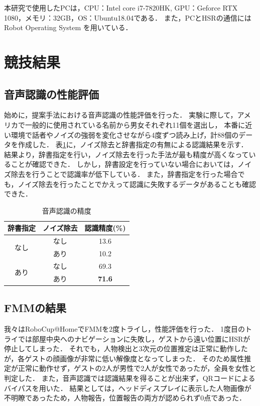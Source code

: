 \documentclass[a4j]{jarticle}
\begin{document}
本研究で使用したPCは，CPU：Intel core i7-7820HK, GPU：Geforce RTX 1080，メモリ：32GB，OS：Ubuntu18.04である．
また，PCとHSRの通信にはRobot Operating System \cite{ros_wiki}を用いている．


\section{競技結果}

\subsection{音声認識の性能評価}
始めに，提案手法における音声認識の性能評価を行った．
実験に際して，アメリカで一般的に使用されている名前から男女それぞれ11個を選出し，
本番に近い環境で話者やノイズの強弱を変化させながら4度ずつ読み上げ，計88個のデータを作成した．
表\ref{voice_recognition_result}に，ノイズ除去と辞書指定の有無による認識結果を示す．
結果より，辞書指定を行い，ノイズ除去を行った手法が最も精度が高くなっていることが確認できた．
しかし，辞書設定を行っていない場合においては，ノイズ除去を行うことで認識率が低下している．
また，辞書指定を行った場合でも，ノイズ除去を行ったことでかえって認識に失敗するデータがあることも確認できた．
\begin{table}[b]
	\centering
	\caption{音声認識の精度}
	\begin{tabular}{|c|c|c|}
	\hline
	辞書指定                & ノイズ除去 & 認識精度(\%)          \\ \hline
	\multirow{2}{*}{なし} & なし    & 13.6          \\ \cline{2-3}
	                    & あり    & 10.2          \\ \hline
	\multirow{2}{*}{あり} & なし    & 69.3          \\ \cline{2-3}
	                    & あり    & \textbf{71.6} \\ \hline
	\end{tabular}
	\label{voice_recognition_result}
\end{table}

\subsection{FMMの結果}
我々はRoboCup@HomeでFMMを2度トライし，性能評価を行った．
1度目のトライでは部屋中央へのナビゲーションに失敗し，ゲストから遠い位置にHSRが停止してしまった．
それでも，人物検出と3次元の位置推定は正常に動作したが，各ゲストの顔画像が非常に低い解像度となってしまった．
そのため属性推定が正常に動作せず，ゲストの2人が男性で2人が女性であったが，全員を女性と判定した．
また，音声認識では認識結果を得ることが出来ず，QRコードによるバイパスを用いた．
結果としては，ヘッドディスプレイに表示した人物画像が不明瞭であったため，人物報告，位置報告の両方が認められず0点であった．
\end{document}
